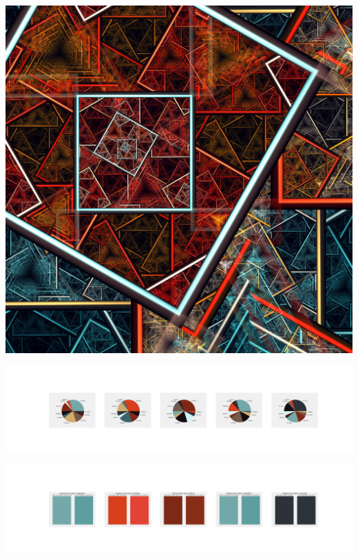 \documentclass[11pt]{article}
\begin{document}
\begin{landscape}
    \begin{center}
    \includegraphics[width=\textwidth]{./nbimg/file (246).jpg}
    \end{center}

    \begin{center}
    \includegraphics[width=250mm]{./nbimg/pie-163.jpg}
    \end{center}

    \begin{center}
    \includegraphics[width=250mm]{./nbimg/peak-163.jpg}
    \end{center}
    


\end{landscape}
\end{document}

